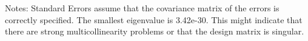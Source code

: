 \bigskip
Notes: \newline 
[1] Standard Errors assume that the covariance matrix of the errors is correctly specified. \newline 
[2] The smallest eigenvalue is 3.42e-30. This might indicate that                there are strong multicollinearity problems or that the design                matrix is singular.